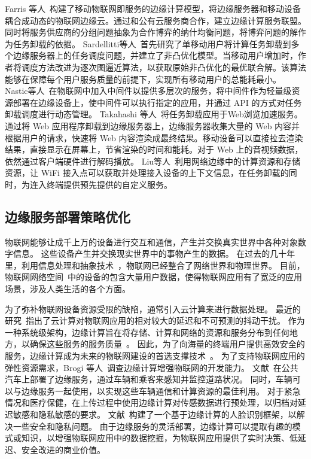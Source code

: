 Farris 等人~\cite{DBLP:journals/fgcs/FarrisMNAI17}构建了移动物联网即服务的边缘计算模型，将边缘服务器和移动设备耦合成动态的物联网边缘云。通过和公有云服务商合作，建立边缘计算服务联盟。同时将服务供应商的分组问题抽象为合作博弈的纳什均衡问题，将博弈问题的解作为任务卸载的依据。
Sardellitti等人~\cite{DBLP:journals/tsipn/SardellittiSB15}首先研究了单移动用户将计算任务卸载到多个边缘服务器上的任务调度问题，并建立了非凸优化模型。当移动用户增加时，作者将调度方法改进为逐次图逼近算法，以获取原始非凸优化的最优联合解。该算法能够在保障每个用户服务质量的前提下，实现所有移动用户的总能耗最小。
Nastic等人~\cite{DBLP:conf/edge/NasticTD16}在物联网中加入中间件以提供多层次的服务，将中间件作为轻量级资源部署在边缘设备上，使中间件可以执行指定的应用，并通过 API 的方式对任务卸载调度进行动态管理。
Takahashi 等人~\cite{DBLP:conf/mobilecloud/TakahashiTK15}将任务卸载应用于Web浏览加速服务。通过将 Web 应用程序卸载到边缘服务器上，边缘服务器收集大量的 Web 内容并根据用户的请求，快速将 Web 内容渲染成最终结果。移动设备可以直接拉去渲染结果，直接显示在屏幕上，节省渲染的时间和能耗。对于 Web 上的音视频数据，依然通过客户端硬件进行解码播放。
Liu等人~\cite{DBLP:conf/edge/LiuWB16}利用网络边缘中的计算资源和存储资源，让 WiFi 接入点可以获取并处理接入设备的上下文信息，在任务卸载的同时，为连入终端提供预先提供的自定义服务。

\subsection{边缘服务部署策略优化}

物联网能够让成千上万的设备进行交互和通信，产生并交换真实世界中各种对象数字信息。
这些设备产生并交换现实世界中的事物产生的数据。
在过去的几十年里，利用信息处理和抽象技术~\cite{DBLP:journals/iotj/GanzPBC15}，物联网已经整合了网络世界和物理世界。
目前，物联网网络空间~\cite{DBLP:journals/cm/WangYXJD17}中的设备的包含大量用户数据，使得物联网应用有了宽泛的应用场景，涉及人类生活的各个方面。

为了弥补物联网设备资源受限的缺陷，通常引入云计算来进行数据处理。
最近的研究~\cite{DBLP:journals/iotj/RazzaqueMPC16}指出了云计算对物联网应用的相对较大的延迟和不可预测的抖动干扰。
作为一种系统级架构，边缘计算旨在将存储、计算和网络的资源和服务分布到任何地方，以确保这些服务的服务质量~\cite{AI201877}。
因此，为了向海量的终端用户提供高效安全的服务，边缘计算成为未来的物联网建设的首选支撑技术~\cite{DBLP:journals/iotj/LinYZYZZ17}。
为了支持物联网应用的弹性资源需求，Brogi 等人~\cite{DBLP:Journals/IOTj/BroGif17}调查边缘计算增强物联网的开发能力。
文献~\cite{DBLP:Journals/IOTj/BasuDanlS17}在公共汽车上部署了边缘服务，通过车辆和乘客来感知并监控道路状况。
同时，车辆可以与边缘服务一起使用，以实现这些车辆通信和计算资源\cite{DBLP:journals/tvt/HouLCWJC16}的最佳利用。
对于紧急情况和医疗保健，\cite{7466912}在上传过程中使用边缘计算对传感数据进行预处理，以归档对延迟敏感和隐私敏感的要求。
文献~\cite{7835115}构建了一个基于边缘计算的人脸识别框架，以解决一些安全和隐私问题。
由于边缘服务的灵活部署，边缘计算可以提取有趣的模式或知识，以增强物联网应用中的数据挖掘，为物联网应用提供了实时决策、低延迟、安全改进的商业价值。

